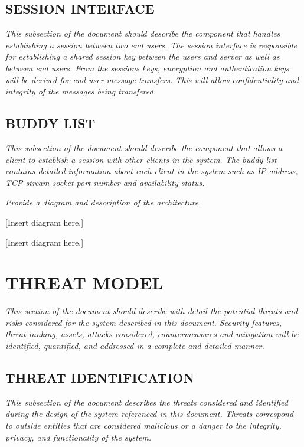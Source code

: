 \documentclass[twoside,letterpaper]{article}
\begin{document}
 \subsection{SESSION INTERFACE}
 {\itshape\color{black}
 This subsection of the document should describe the component that handles
 establishing a session between two end users. The session interface is responsible for establishing
 a shared session key between the users and server as well as between end users. From
 the sessions keys, encryption and authentication keys will be derived for end user
 message transfers. This will allow confidentiality and integrity of the messages being transfered. \ }
 
\subsection{BUDDY LIST}
{\itshape\color{black}
This subsection of the document should describe the component that allows a client
to establish a session with other clients in the system. The buddy list contains detailed
information about each client in the system such as IP address, TCP stream socket port number
and availability status. \ }

\bigskip

{\itshape\color{black}
Provide a diagram and description of the architecture.}

\bigskip

{\color{black}
[Insert diagram here.]}

\bigskip

{\color{black}
[Insert diagram here.]}

\clearpage\setcounter{page}{1}\pagestyle{Convertvi}
\section{THREAT MODEL}
{\itshape\color{black} 
This section of the document should describe with detail the potential threats
and risks considered for the system described in this document. Security features,
threat ranking, assets, attacks considered, countermeasures 
and mitigation will be identified, quantified, and addressed in a complete 
and detailed manner. \ }
 
\subsection{THREAT IDENTIFICATION}
{\itshape\color{black}
This subsection of the document describes the threats
considered and identified during the design of the system referenced
in this document. Threats correspond to outside entities that are considered
malicious or a danger to the integrity, privacy, and functionality of the system. \ }
\end{document}
